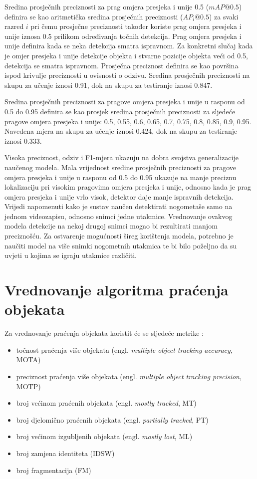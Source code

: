 \documentclass[times, utf8, seminar, numeric]{fer}
\begin{document}
Sredina prosječnih preciznosti za prag omjera presjeka i unije 0.5 (\(mAP@0.5\)) definira se kao aritmetička sredina prosječnih preciznosti (\(AP_i@0.5\)) za svaki razred \(i\) pri čemu prosječne preciznosti također koriste prag omjera presjeka i unije iznosa 0.5 prilikom određivanja točnih detekcija.
Prag omjera presjeka i unije definira kada se neka detekcija smatra ispravnom. Za konkretni slučaj kada je omjer presjeka i unije detekcije objekta i stvarne pozicije objekta veći od 0.5, detekcija se smatra ispravnom.	
Prosječna preciznost definira se kao površina ispod krivulje preciznosti u ovisnosti o odzivu.
Sredina prosječnih preciznosti na skupu za učenje iznosi 0.91, dok na skupu za testiranje iznosi 0.847. 

Sredina prosječnih preciznosti za pragove omjera presjeka i unije u rasponu od 0.5 do 0.95 definira se kao prosjek sredina prosječnih preciznosti za sljedeće pragove omjera presjeka i unije: 0.5, 0.55, 0.6, 0.65, 0.7, 0.75, 0.8, 0.85, 0.9, 0.95.
Navedena mjera na skupu za učenje iznosi 0.424, dok na skupu za testiranje iznosi 0.333.

Visoka preciznost, odziv i F1-mjera ukazuju na dobra svojstva generalizacije naučenog modela. 
Mala vrijednost sredine prosječnih preciznosti za pragove omjera presjeka i unije u rasponu od 0.5 do 0.95 ukazuje na manje preciznu lokalizaciju pri visokim pragovima omjera presjeka i unije, odnosno kada je prag omjera presjeka i unije vrlo visok, detektor daje manje ispravnih detekcija.
Vrijedi napomenuti kako je sustav naučen detektirati nogometaše samo na jednom videozapisu, odnosno snimci jedne utakmice. Vrednovanje ovakvog modela detekcije na nekoj drugoj snimci mogao bi rezultirati manjom preciznošću. Za ostvarenje mogućnosti šireg korištenja modela, potrebno je naučiti model na više snimki nogometnih utakmica te bi bilo poželjno da su uvjeti u kojima se igraju utakmice različiti.

\section{Vrednovanje algoritma praćenja objekata}

Za vrednovanje praćenja objekata koristit će se sljedeće metrike \cite{MOT16}:

\begin{itemize}
	\item točnost praćenja više objekata (engl. \textit{multiple object tracking accuracy}, MOTA)
	\item preciznost praćenja više objekata (engl. \textit{multiple object tracking precision}, MOTP)
	\item broj većinom praćenih objekata (engl. \textit{mostly tracked}, MT)
	\item broj djelomično praćenih objekata (engl. \textit{partially tracked}, PT)
	\item broj većinom izgubljenih objekata (engl. \textit{mostly lost}, ML)
	\item broj zamjena identiteta (IDSW)
	\item broj fragmentacija (FM)	
\end{itemize}
\end{document}
